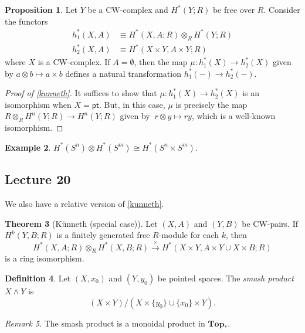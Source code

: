 \documentclass[10pt,letterpaper,cm]{nupset}
\theoremstyle{definition}
\newtheorem{definition}{Definition}[subsection]
\newtheorem{exmp}[definition]{Example}
\theoremstyle{theorem}
\newtheorem{theorem}[definition]{Theorem}
\newtheorem{prop}[definition]{Proposition}
\theoremstyle{remark}
\newtheorem{remark}[definition]{Remark}
\newcommand{\1}{\mathbb{1}}
\newcommand{\0}{\vec 0}
\newcommand{\pt}{\mathsf{pt}}
\begin{document}
\begin{prop}
Let $Y$ be a CW-complex and $H^{\ast}(Y; R)$ be free over $R$. Consider the functors 
\begin{align*} h^{\ast}_1(X, A)&  \equiv H^{\ast}(X, A; R) \otimes_R H^{\ast}(Y; R) \\ h_2^{\ast}(X, A) & \equiv H^{\ast}(X \times Y, A \times Y; R)
 \end{align*} where $X$ is a CW-complex. If $A= \emptyset$, then the map $\mu : h_1^{\ast}(X) \to h_2^{\ast}(X)$ given by $a \otimes b \mapsto a \times b$ defines a natural transformation $h_1^{\ast}({-}) \to h_2^{\ast}({-})$. 
\end{prop}

\begin{proof}[Proof of \cref{kunneth}]
It suffices to show that $\mu : h_1^{\ast}(X) \to h_2^{\ast}(X)$ is an isomorphism when $X = \pt$. But, in this case, $\mu$ is precisely the map $R\otimes_R H^n(Y; R) \to H^n(Y; R)$ given by $\ r \otimes y \mapsto ry$, which is a well-known isomorphism.  
\end{proof}

\begin{exmp}
 $H^{\ast}(S^n) \otimes  H^{\ast}(S^m) \cong H^{\ast}(S^n \times S^m)$.
 \end{exmp}

\subsection{Lecture 20}

We also have a relative version of \cref{kunneth}.

\begin{theorem}[K\"unneth (special case)]
Let $(X, A)$ and $(Y, B)$ be CW-pairs. If $H^k(Y, B; R)$ is a finitely generated free $R$-module for each $k$, then $$ H^{\ast}(X, A; R) \otimes_R H^{\ast}(X, B; R) \overset{\times}{\longrightarrow} H^{\ast}(X \times Y, A \times Y \cup X \times B; R)$$ is a ring isomorphism. 
\end{theorem}

\begin{definition}
Let $\left(X, x_0\right)$ and $\left(Y, y_0\right)$ be pointed spaces. The \textit{smash product $X \wedge Y$} is $$\left(X \times Y\right)/\left(X \times \{y_0\} \cup \{x_0\} \times Y\right).$$
\end{definition}

\begin{remark}
The smash product is a monoidal product in $\mathbf{Top}_{\ast}$.
\end{remark}
\end{document}
